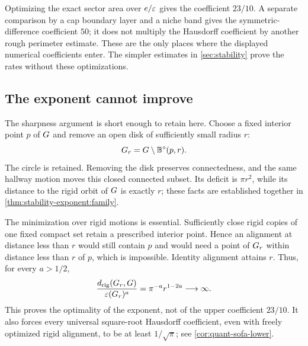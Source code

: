 Optimizing the exact sector area over $e/\varepsilon$ gives the coefficient $23/10$.
A separate comparison by a cap boundary layer and a niche band gives the
symmetric-difference coefficient $50$; it does not multiply the Hausdorff
coefficient by another rough perimeter estimate. These are the only places
where the displayed numerical coefficients enter. The simpler estimates in
\cref{sec:stability} prove the rates without these optimizations.

\subsection{The exponent cannot improve}

The sharpness argument is short enough to retain here. Choose a fixed interior
point $p$ of $G$ and remove an open disk of sufficiently small radius $r$:
\[
 G_r=G\setminus\mathbb B^\circ(p,r).
\]
The circle is retained. Removing the disk preserves connectedness, and the
same hallway motion moves this closed connected subset. Its deficit is
$\pi r^2$, while its distance to the rigid orbit of $G$ is exactly $r$;
these facts are established together in \cref{thm:stability-exponent:family}.

The minimization over rigid motions is essential. Sufficiently close rigid
copies of one fixed compact set retain a prescribed interior point. Hence
an alignment at distance less than $r$ would still contain $p$ and would need
a point of $G_r$ within distance less than $r$ of $p$, which is impossible.
Identity alignment attains $r$. Thus, for every $a>1/2$,
\[
 \frac{d_{\mathrm{rig}}(G_r,G)}{\varepsilon(G_r)^a}
 =\pi^{-a}r^{1-2a}\longrightarrow\infty.
\]
This proves the optimality of the exponent, not of the upper coefficient
$23/10$. It also forces every universal square-root Hausdorff coefficient,
even with freely optimized rigid alignment, to be at least $1/\sqrt\pi$;
see \cref{cor:quant-sofa-lower}.
